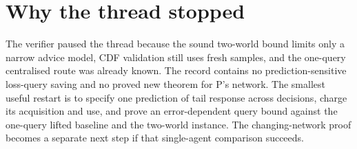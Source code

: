 \documentclass{article}
\begin{document}
\section{Why the thread stopped}

The verifier paused the thread because the sound two-world bound limits only a narrow advice model, CDF
validation still uses fresh samples, and the one-query centralised route was already known. The record
contains no prediction-sensitive loss-query saving and no proved new theorem for P's network. The smallest
useful restart is to specify one prediction of tail response across decisions, charge its acquisition and use,
and prove an error-dependent query bound against the one-query lifted baseline and the two-world instance. The
changing-network proof becomes a separate next step if that single-agent comparison succeeds.



\end{document}

